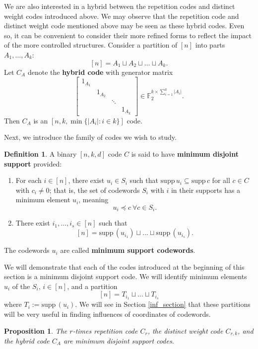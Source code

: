 \documentclass[12pt]{article}
\newcommand{\F}{\mathbb{F}}
\def\F{\mathbb F}
\def\supp{\mathrm{supp}\,}
\newtheorem{proposition}[theorem]{Proposition}
\theoremstyle{definition}
\newtheorem{definition}[theorem]{Definition}
\begin{document}
We are also interested in a hybrid between the repetition codes and distinct weight codes introduced above. We may observe that the repetition code and distinct weight code mentioned above may be seen as these hybrid codes. Even so, it can be convenient to consider their more refined forms to reflect the impact of the more controlled structures. Consider a partition of $[n]$ into parts $A_1, \dots, A_k$:
$$
[n] = A_1 \sqcup A_2 \sqcup \dots \sqcup A_k.
$$
Let $C_A$ denote the {\bf hybrid code} with generator matrix 
$$\left[ 
\begin{array}{cccc}
1_{A_1} &  & & \\
& 1_{A_2} & & \\
& & \ddots & \\
& & & 1_{A_k} 
\end{array}
\right] \in \F_2^{k \times \sum_{i=1}^k | A_i |}.$$
Then $C_A$ is an $[n,k,\min \{ |A_i| \colon i \in k \}]$ code. 


Next, we introduce the family of codes we wish to study. 

\begin{definition} A binary $[n,k,d]$ code $C$ is said to have {\bf minimum disjoint support} provided:
\begin{enumerate}
\item  For each $i \in [n]$, there exist $u_i \in S_i$ such that
$\supp u_i \subseteq \supp c$ for all $c \in C$ with $c_i \neq 0$; that is, the set of
codewords $S_i$ with $i$ in their supports has a minimum element $u_i$, meaning $$u_i \preceq c \ \forall c \in S_i.$$ 
\item There exist   $i_1, \dots, i_s \in [n]$ such that 
 $$[n] = \supp(u_{i_1}) \sqcup \dots \sqcup \supp(u_{i_s}).$$
\end{enumerate}
The codewords $u_i$ are called {\bf minimum support codewords}.
\end{definition}

We will demonstrate that each of the codes introduced at the beginning of this section is a minimum disjoint support code. We will identify minimum elements $u_i$ of the $S_i$, $i \in [n]$, and a partition 
 $$[n] =T_{i_1} \sqcup \dots \sqcup T_{i_s}$$
 where $T_i:=\supp(u_i)$. We will see in Section \ref{inf_section} that these partitions will be very useful in finding influences of coordinates of codewords. 


\begin{proposition}
    The $r$-times repetition code $C_r$, the distinct weight code $C_{r,k}$, and the hybrid code $C_A$ are minimum disjoint support codes.
\end{proposition}
\end{document}
